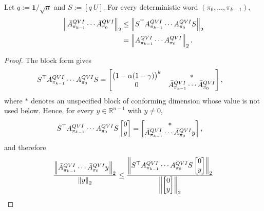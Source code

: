 \documentclass[10pt,a4paper]{amsart}
\newcommand{\R}{\mathbb{R}}
\begin{document}
\begin{lemma}
\label{lem:projected-product-norm-bound}
Let $q:=\mathbf{1}/\sqrt n$ and $S:=[q\ U]$. For every deterministic word
$(\pi_0,\ldots,\pi_{k-1})$,
\begin{align*}
  \left\lVert
    \bar A_{\pi_{k-1}}^{\rm QVI}\cdots \bar A_{\pi_0}^{\rm QVI}
  \right\rVert_2
  &\le
  \left\lVert
    S^\top A_{\pi_{k-1}}^{\rm QVI}\cdots A_{\pi_0}^{\rm QVI}S
  \right\rVert_2\\
  &=
  \left\lVert
    A_{\pi_{k-1}}^{\rm QVI}\cdots A_{\pi_0}^{\rm QVI}
  \right\rVert_2.
\end{align*}
\end{lemma}

\begin{proof}
The block form gives
\begin{equation*}
\begin{aligned}
&S^\top A_{\pi_{k-1}}^{\rm QVI}\cdots A_{\pi_0}^{\rm QVI}S =
  \begin{bmatrix}
    \bigl(1-\alpha(1-\gamma)\bigr)^k&*\\
    0&\bar A_{\pi_{k-1}}^{\rm QVI}\cdots \bar A_{\pi_0}^{\rm QVI}
  \end{bmatrix},
\end{aligned}
\end{equation*}
where $*$ denotes an unspecified block of conforming dimension whose value is not
used below. Hence, for every $y\in\R^{n-1}$ with $y\ne0$,
\begin{align*}
  &S^\top A_{\pi_{k-1}}^{\rm QVI}\cdots A_{\pi_0}^{\rm QVI}S
  \begin{bmatrix}0\\y\end{bmatrix}
  =
  \begin{bmatrix}
    *\\
    \bar A_{\pi_{k-1}}^{\rm QVI}\cdots \bar A_{\pi_0}^{\rm QVI}y
  \end{bmatrix},
\end{align*}
and therefore
\begin{align*}
  \frac{
  \left\lVert
    \bar A_{\pi_{k-1}}^{\rm QVI}\cdots \bar A_{\pi_0}^{\rm QVI}y
  \right\rVert_2}{\left\lVert y\right\rVert_2}
  &\le
  \frac{
  \left\lVert
    S^\top A_{\pi_{k-1}}^{\rm QVI}\cdots A_{\pi_0}^{\rm QVI}S
    \begin{bmatrix}0\\y\end{bmatrix}
  \right\rVert_2}{\left\lVert \begin{bmatrix}0\\y\end{bmatrix}\right\rVert_2}\\

\end{align*}
\end{proof}
\end{document}
